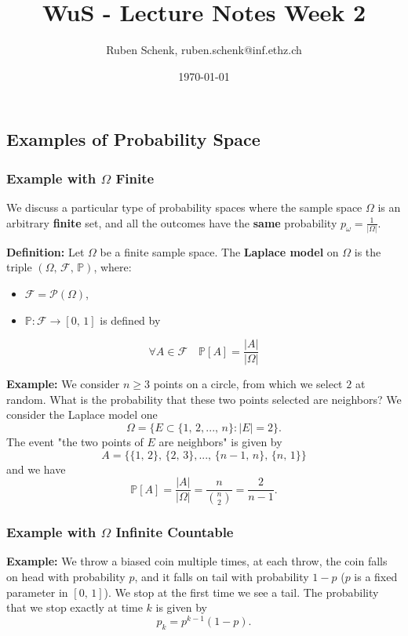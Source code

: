 \documentclass[a4paper]{extarticle}
\title{WuS - Lecture Notes Week 2}
\author{Ruben Schenk, ruben.schenk@inf.ethz.ch}
\date{\today}
\begin{document}
\maketitle

\subsection{Examples of Probability Space}

\subsubsection{Example with \(\Omega\) Finite}

We discuss a particular type of probability spaces where the sample space \(\Omega\) is an arbitrary \textbf{finite} set, and all the outcomes have the \textbf{same} probability \(p_{\omega} = \frac{1}{|\Omega|}\).

\textbf{Definition:} Let \(\Omega\) be a finite sample space. The \textbf{Laplace model} on \(\Omega\) is the triple \((\Omega, \, \mathcal{F}, \, \mathbb{P})\), where:

\begin{itemize}
    \item \(\mathcal{F} = \mathcal{P}(\Omega)\),
    \item \(\mathbb{P} : \mathcal{F} \to [0, \, 1]\) is defined by
\end{itemize}
\[
    \forall A \in \mathcal{F} \quad \mathbb{P}[A] = \frac{|A|}{|\Omega|}
\]

\begin{ebox}
    \textbf{Example:} We consider \(n \geq 3\) points on a circle, from which we select \(2\) at random. What is the probability that these two points selected are neighbors? We consider the Laplace model one
    \[
        \Omega = \{E \subset \{1, \, 2,..., \, n\} : |E| = 2\}.
    \]
    The event "the two points of \(E\) are neighbors" is given by
    \[
        A = \{\{1, \, 2\}, \, \{2, \, 3\},..., \, \{n-1, \, n\}, \, \{n, \, 1\}\}
    \]
    and we have
    \[
        \mathbb{P}[A] = \frac{|A|}{|\Omega|} = \frac{n}{\binom{n}{2}} = \frac{2}{n - 1}.
    \]
\end{ebox}

\subsubsection{Example with \(\Omega\) Infinite Countable}

\textbf{Example:} We throw a biased coin multiple times, at each throw, the coin falls on head with probability \(p\), and it falls on tail with probability \(1 - p\) (\(p\) is a fixed parameter in \([0, \, 1]\)). We stop at the first time we see a tail. The probability that we stop exactly at time \(k\) is given by
\[
    p_k = p^{k-1}(1-p).
\]
\end{document}
